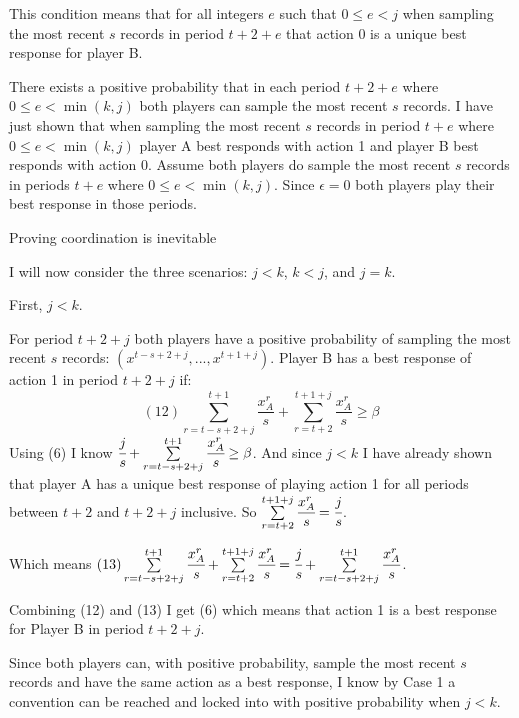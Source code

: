\documentclass{article}
\begin{document}
This condition means that for all integers $e$ such that $0 \leq e<j$ when sampling the most recent $s$ records in period $t+2+e$ that action 0 is a unique best response for player B.

\vskip12pt

There exists a positive probability that in each period $t+2+e$ where $0 \leq e<\min (k,j)$ both players can sample the most recent $s$ records. I have just shown that when sampling the most recent $s$ records in period $t+e$ where $0 \leq e<\min (k,j)$ player A best responds with action 1 and player B best responds with action 0. Assume both players do sample the most recent $s$ records in periods $t+e$ where $0 \leq e<\min (k,j)$. Since $\epsilon=0$ both players play their best response in those periods.

\vskip12pt

\centering

Proving coordination is inevitable

\vskip6pt

\raggedright

I will now consider the three scenarios: $j<k$, $k<j$, and $j=k$.

\vskip12pt

First, $j<k$. 

\vskip6pt

For period $t+2+j$ both players have a positive probability of sampling the most recent $s$ records: $(x^{t-s+2+j},...,x^{t+1+j})$. Player B has a best response of action 1 in period $t+2+j$ if:
$$(12) \sum\limits_{r=t-s+2+j}^{t+1}\frac{x^r_A}{s}+\sum\limits_{r=t+2}^{t+1+j} \frac{x^r_A}{s} \geq \beta$$
Using (6) I know $\cfrac{j}{s}+\sum\limits_{r=t-s+2+j}^{t+1}\cfrac{x^r_A}{s} \geq \beta$. And since $j<k$ I have already shown that player A has a unique best response of playing action 1 for all periods between $t+2$ and $t+2+j$ inclusive. So $\sum\limits_{r=t+2}^{t+1+j} \cfrac{x^r_A}{s}=\cfrac{j}{s}$.

Which means $(13) \sum\limits_{r=t-s+2+j}^{t+1}\cfrac{x^r_A}{s}+\sum\limits_{r=t+2}^{t+1+j} \cfrac{x^r_A}{s}=\cfrac{j}{s}+\sum\limits_{r=t-s+2+j}^{t+1}\cfrac{x^r_A}{s}$.

Combining (12) and (13) I get (6) which means that action 1 is a best response for Player B in period $t+2+j$.

\vskip6pt

Since both players can, with positive probability, sample the most recent $s$ records and have the same action as a best response, I know by Case 1 a convention can be reached and locked into with positive probability when $j<k$.
\end{document}

